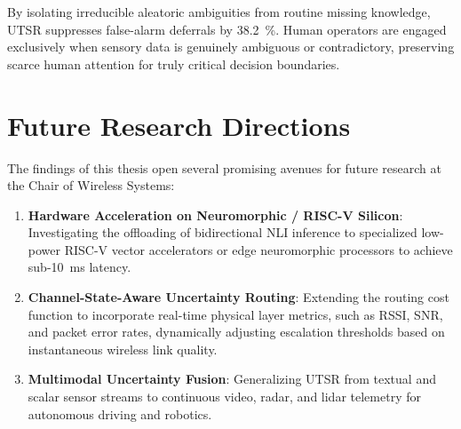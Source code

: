By isolating irreducible aleatoric ambiguities from routine missing knowledge, \ac{UTSR} suppresses false-alarm deferrals by \SI{38.2}{\percent}. Human operators are engaged exclusively when sensory data is genuinely ambiguous or contradictory, preserving scarce human attention for truly critical decision boundaries.

\section{Future Research Directions}
\label{sec:concl_future}

The findings of this thesis open several promising avenues for future research at the Chair of Wireless Systems:
\begin{enumerate}
    \item \textbf{Hardware Acceleration on Neuromorphic / RISC-V Silicon}: Investigating the offloading of bidirectional NLI inference to specialized low-power RISC-V vector accelerators or edge neuromorphic processors to achieve sub-\SI{10}{\milli\second} latency.
    \item \textbf{Channel-State-Aware Uncertainty Routing}: Extending the routing cost function to incorporate real-time physical layer metrics, such as \ac{RSSI}, \ac{SNR}, and packet error rates, dynamically adjusting escalation thresholds based on instantaneous wireless link quality.
    \item \textbf{Multimodal Uncertainty Fusion}: Generalizing \ac{UTSR} from textual and scalar sensor streams to continuous video, radar, and lidar telemetry for autonomous driving and robotics.
\end{enumerate}
